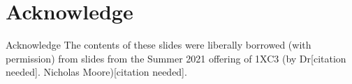 \documentclass[11pt]{beamer}
\begin{document}
\section[Acknowledge]{Acknowledge}
\begin{frame}{Acknowledge}
\center
\vspace{8em}
The contents of these slides were liberally borrowed (with permission) from slides from the Summer 2021 offering of 1XC3 (by Dr[citation needed]. Nicholas Moore)[citation needed].  
\end{frame}
\end{document}
